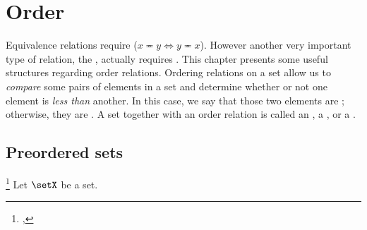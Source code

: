 



\chapter{Order}
\label{chp:order}
Equivalence relations 
require  ($x\eqcirc y\iff y\eqcirc x$).
However another very important type of relation,
the , actually requires .
This chapter presents some useful structures regarding order relations.
Ordering relations on a set allow us to \emph{compare} 
some pairs of elements in a set
and determine whether or not one element is \emph{less than} another.
In this case, we say that those two elements are ;
otherwise, they are .
A set together with an order relation is called an ,
a , or a  .

\section{Preordered sets}
\begin{definition}
\footnote{
  ,
  }
\label{def:preorder}
Let $\setX$ be a set.
\end{definition}

